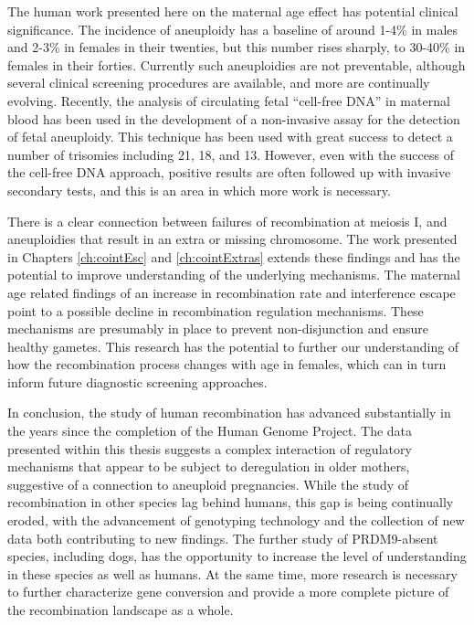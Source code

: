 The human work presented here on the maternal age effect has potential clinical significance.
The incidence of aneuploidy has a baseline of around 1-4\% in males and 2-3\% in females in their twenties, but this number rises sharply, to 30-40\% in females in their forties\cite{Hassold2009,Nagaoka2012}.
Currently such aneuploidies are not preventable, although several clinical screening procedures are available, and more are continually evolving.
Recently, the analysis of circulating fetal ``cell-free DNA'' in maternal blood has been used in the development of a non-invasive assay for the detection of fetal aneuploidy\cite{Lo2007}.
This technique has been used with great success to detect a number of trisomies including 21\cite{Papageorgiou2011}, 18\cite{Palomaki2012}, and 13\cite{Palomaki2012}.
However, even with the success of the cell-free DNA approach, positive results are often followed up with invasive secondary tests, and this is an area in which more work is necessary.

There is a clear connection between failures of recombination at meiosis I, and aneuploidies that result in an extra or missing chromosome\cite{Nagaoka2012}.
The work presented in Chapters \ref{ch:cointEsc} and \ref{ch:cointExtras} extends these findings and has the potential to improve understanding of the underlying mechanisms.
The maternal age related findings of an increase in recombination rate and interference escape point to a possible decline in recombination regulation mechanisms.
These mechanisms are presumably in place to prevent non-disjunction and ensure healthy gametes.
This research has the potential to further our understanding of how the recombination process changes with age in females, which can in turn inform future diagnostic screening approaches.





In conclusion, the study of human recombination has advanced substantially in the years since the completion of the Human Genome Project.
The data presented within this thesis suggests a complex interaction of regulatory mechanisms that appear to be subject to deregulation in older mothers, suggestive of a connection to aneuploid pregnancies.
While the study of recombination in other species lag behind humans, this gap is being continually eroded, with the advancement of genotyping technology and the collection of new data both contributing to new findings.
The further study of PRDM9-absent species, including dogs, has the opportunity to increase the level of understanding in these species as well as humans. %
At the same time, more research is necessary to further characterize gene conversion and provide a more complete picture of the recombination landscape as a whole.



